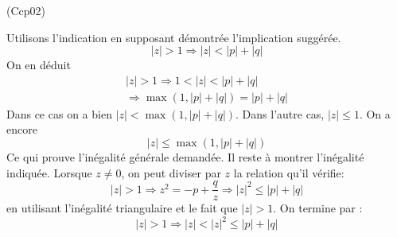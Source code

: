\begin{tiny}(Ccp02)\end{tiny} Utilisons l'indication en supposant démontrée l'implication suggérée.
\begin{displaymath}
 |z|>1 \Rightarrow |z|<|p|+|q|   
\end{displaymath}
On en déduit
\begin{multline*}
|z|>1 \Rightarrow 1<|z|<|p|+|q|\\
 \Rightarrow \max(1,|p|+|q|)=|p|+|q|
\end{multline*}
Dans ce cas on a bien $|z|< \max(1,|p|+|q|)$.\newline
Dans l'autre cas, $|z|\leq 1$. On a encore 
\begin{displaymath}
 |z|\leq \max(1,|p|+|q|)
\end{displaymath}
Ce qui prouve l'inégalité générale demandée.\newline
Il reste à montrer l'inégalité indiquée. Lorsque $z\neq 0$, on peut diviser par $z$ la relation qu'il vérifie:
\begin{displaymath}
 |z|>1 \Rightarrow z^2 = -p+\frac{q}{z}
\Rightarrow |z|^2 \leq |p|+|q|
\end{displaymath}
en utilisant l'inégalité triangulaire et le fait que $|z|>1$.
On termine par :
\begin{displaymath}
 |z|>1\Rightarrow |z|<|z|^2\leq |p|+|q|
\end{displaymath}

